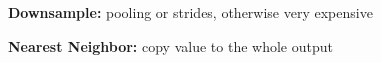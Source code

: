 \textbf{Downsample:} pooling or strides, otherwise very expensive\\

\textbf{Nearest Neighbor:} copy value to the whole output\\ 

